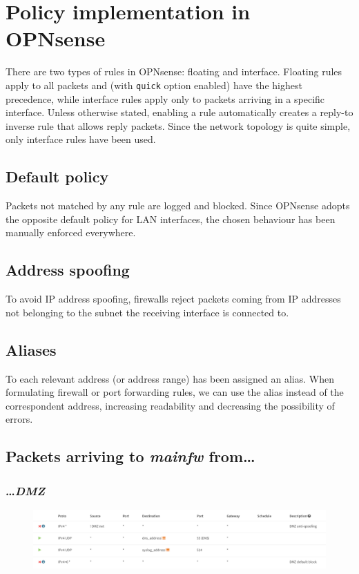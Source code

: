 \documentclass{homework}
\newcommand{\opn}{OPNsense\xspace}
\newcommand{\dmz}{\textit{DMZ}\xspace}
\newcommand{\mainfw}{\textit{mainfw}\xspace}
\begin{document}
    
    \section{Policy implementation in \opn}
    There are two types of rules in \opn: floating and interface.
    Floating rules apply to all packets and (with \texttt{quick} option enabled) have the highest precedence, while interface rules apply only to packets arriving in a specific interface.
    Unless otherwise stated, enabling a rule automatically creates a reply-to inverse rule that allows reply packets.
    Since the network topology is quite simple, only interface rules have been used.
    
    \subsection{Default policy}
    Packets not matched by any rule are logged and blocked.
    Since \opn adopts the opposite default policy for LAN interfaces, the chosen behaviour has been manually enforced everywhere.
    
    \subsection{Address spoofing}
    To avoid IP address spoofing, firewalls reject packets coming from IP addresses not belonging to the subnet the receiving interface is connected to.
    
    \subsection{Aliases}
    To each relevant address (or address range) has been assigned an alias.
    When formulating firewall or port forwarding rules, we can use the alias instead of the correspondent address, increasing readability and decreasing the possibility of errors.
    
    \subsection{Packets arriving to \mainfw from\dots}
    \subsubsection{\dots \dmz}
    \begin{figure}[H]
        \centering
        \includegraphics[width=\linewidth]{images/mainfw-DMZ}
        \label{fig:mainfw-dmz}
    \end{figure}
    
\end{document}
